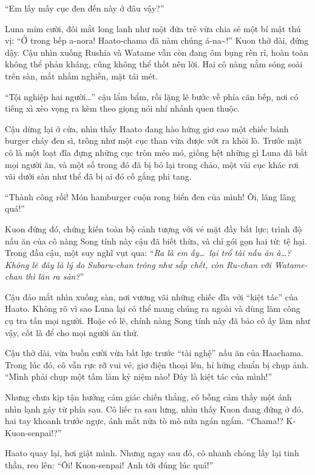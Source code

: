 \documentclass[../main.tex]{subfiles}
\begin{document}
``Em lấy mấy cục đen đến này ở đâu vậy?''

Luna mỉm cười, đôi mắt long lanh như một đứa trẻ vừa chia sẻ một bí mật thú vị: ``Ở trong bếp a-nora! Haato-chama đã nàm chúng á-na\~{}!'' Kuon thở dài, đứng dậy. Cậu nhìn xuống Rushia và Watame vẫn còn đang ôm bụng rên rỉ, hoàn toàn không thể phản kháng, cũng không thể thốt nên lời. Hai cô nàng nằm sóng soài trên sàn, mắt nhắm nghiền, mặt tái mét.

``Tội nghiệp hai người\dots'' cậu lẩm bẩm, rồi lặng lẽ bước về phía căn bếp, nơi có tiếng xì xèo vọng ra kèm theo giọng nói nhí nhảnh quen thuộc.

Cậu dừng lại ở cửa, nhìn thấy Haato đang hào hứng giơ cao một chiếc bánh burger cháy đen sì, trông như một cục than vừa được vớt ra khỏi lò. Trước mặt cô là một loạt đĩa đựng những cục tròn méo mó, giống hệt những gì Luna đã bắt mọi người ăn, và một số trong đó đã bị bỏ lại trong chảo, một vài cục khác rơi vãi dưới sàn như thể đã bị ai đó cố gắng phi tang.

``Thành công rồi! Món hamburger cuộn rong biển đen của mình! Ôi, lâng lâng quá!''

Kuon đứng đó, chứng kiến toàn bộ cảnh tượng với vẻ mặt đầy bất lực; trình độ nấu ăn của cô nàng Song tính này cậu đã biết thừa, và chỉ gói gọn hai từ: tệ hại. Trong đầu cậu, một suy nghĩ vụt qua: ``\textit{Ra là em ấy\dots\ lại trổ tài nấu ăn à\dots? Không lẽ đây là lý do Subaru-chan trông như sắp chết, còn Ru-chan với Watame-chan thì lăn ra sàn?}''

Cậu đảo mắt nhìn xuống sàn, nơi vương vãi những chiếc đĩa với ``kiệt tác'' của Haato. Không rõ vì sao Luna lại có thể mang chúng ra ngoài và dùng làm công cụ tra tấn mọi người. Hoặc có lẽ, chính nàng Song tính này đã bảo cô ấy làm như vậy, cốt là để cho mọi người ăn thử.


Cậu thở dài, vừa buồn cười vừa bất lực trước ``tài nghệ'' nấu ăn của Haachama. Trong lúc đó, cô vẫn rực rỡ vui vẻ, giơ điện thoại lên, hí hửng chuẩn bị chụp ảnh. ``Mình phải chụp một tấm làm kỷ niệm nào! Đây là kiệt tác của mình!''

Nhưng chưa kịp tận hưởng cảm giác chiến thắng, cô bỗng cảm thấy một ánh nhìn lạnh gáy từ phía sau. Cô liếc ra sau lưng, nhìn thấy Kuon đang đứng ở đó, hai tay khoanh trước ngực, ánh mắt nửa tò mò nửa ngán ngẩm. ``Chama!? K-Kuon-senpai!?''

Haato quay lại, hơi giật mình. Nhưng ngay sau đó, cô nhanh chóng lấy lại tinh thần, reo lên: ``Ôi! Kuon-senpai! Anh tới đúng lúc quá!''
\end{document}
